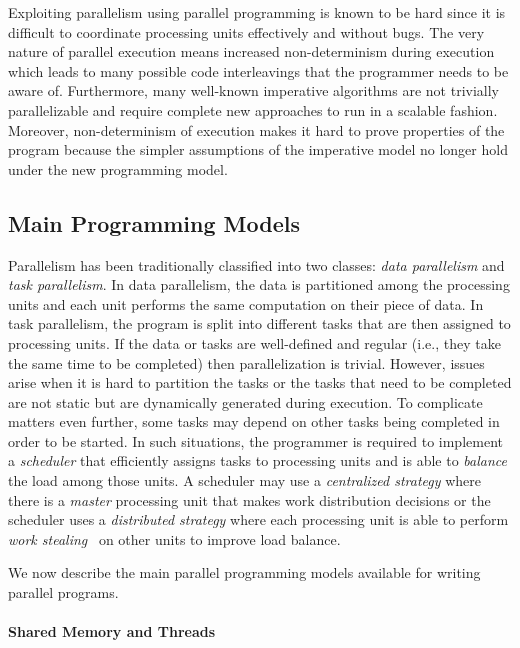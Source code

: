 Exploiting parallelism using parallel programming is known to be hard since it
is difficult to coordinate processing units effectively and without bugs. The
very nature of parallel execution means increased non-determinism during
execution which leads to many possible code interleavings that the programmer
needs to be aware of. Furthermore, many well-known imperative algorithms are not
trivially parallelizable and require complete new approaches to run in a
scalable fashion. Moreover, non-determinism of execution makes it hard to prove
properties of the program because the simpler assumptions of the imperative
model no longer hold under the new programming model.

\subsection{Main Programming Models}

Parallelism has been traditionally classified into two classes: \emph{data
parallelism} and \emph{task parallelism}. In data parallelism, the data is
partitioned among the processing units and each unit performs the same
computation on their piece of data. In task parallelism, the program is split
into different tasks that are then assigned to processing units. If the data or
tasks are well-defined and regular (i.e., they take the same time to be
completed) then parallelization is trivial. However, issues arise when it is
hard to partition the tasks or the tasks that need to be completed are not
static but are dynamically generated during execution. To complicate matters even
further, some tasks may depend on other tasks being completed in order to be
started. In such situations, the programmer is required to implement a \emph{scheduler} that
efficiently assigns tasks to processing units and is able to \emph{balance} the
load among those units. A scheduler may use a \emph{centralized strategy} where
there is a \emph{master} processing unit that makes work distribution decisions
or the scheduler uses a \emph{distributed strategy} where each
processing unit is able to perform \emph{work stealing}~\cite{Blumofe:1999} on
other units to improve load balance.

We now describe the main parallel programming models available for writing
parallel programs.

\paragraph{Shared Memory and Threads}

